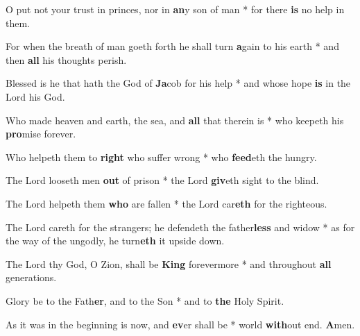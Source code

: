 \begin{multicols}{2}
	O put not your trust in princes, nor in \textbf{an}y son of man * for there \textbf{is} no help in them.
	
	For when the breath of man goeth forth he shall turn \textbf{a}gain to his earth * and then \textbf{all} his thoughts perish.
	
	Blessed is he that hath the God of \textbf{Ja}cob for his help * and whose hope \textbf{is} in the Lord his God.
	
	Who made heaven and earth, the sea, and \textbf{all} that therein is * who keepeth his \textbf{pro}mise forever.
	
	Who helpeth them to \textbf{right} who suffer wrong * who \textbf{feed}eth the hungry.
	
	The Lord looseth men \textbf{out} of prison * the Lord \textbf{giv}eth sight to the blind.
	
	The Lord helpeth them \textbf{who} are fallen * the Lord car\textbf{eth} for the righteous.
	
	The Lord careth for the strangers; he defendeth the father\textbf{less} and widow * as for the way of the ungodly, he turn\textbf{eth} it upside down.
	
	The Lord thy God, O Zion, shall be \textbf{King} forevermore * and throughout \textbf{all} generations.
	
	Glory be to the Fath\textbf{er}, and to the Son * and to \textbf{the} Holy Spirit.
	
	As it was in the beginning is now, and \textbf{ev}er shall be * world \textbf{with}out end. \textbf{A}men.
\end{multicols}